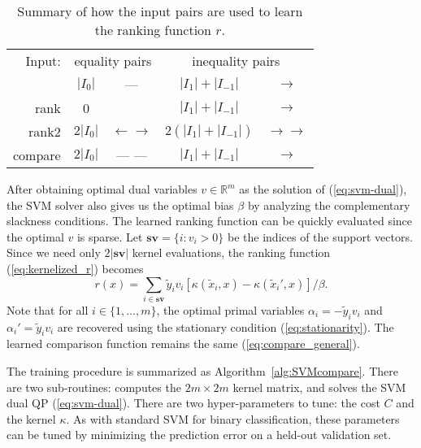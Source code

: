 \documentclass{article}
\newcommand{\RR}{\mathbb R}
\begin{document}
\begin{table}[b!]
  \centering
  \begin{tabular}{r|cc|cc|}
Input:&    \multicolumn{2}{c|}{equality pairs}
&    \multicolumn{2}{c|}{inequality pairs}\\
    & $|I_0|$ %
    & --- 
    & $|I_1|+|I_{-1}|$ %
    & $\rightarrow$
    \\
    \hline
    rank 
    & 0 
    & 
    & $|I_1|+|I_{-1}|$ 
    & $\rightarrow$ 
    \\
    \hline
    rank2 
    & $2|I_0|$ 
    & $\leftarrow \rightarrow$
    & $2(|I_1|+|I_{-1}|)$ 
    & $\rightarrow \rightarrow$
    \\
    \hline
    compare 
    & $2|I_0|$ 
    & --- --- 
    & $|I_1|+|I_{-1}|$ 
    & $\rightarrow$\\
    \hline
  \end{tabular}
  \caption{\label{tab:models}
    Summary of how the input pairs are used to learn the ranking 
    function $r$.}
\end{table}

After obtaining optimal dual variables $v\in\RR^m$ as the solution of
(\ref{eq:svm-dual}), the SVM solver also gives us the optimal bias
$\beta$ by analyzing the complementary slackness conditions.
The learned ranking function can be quickly evaluated since the
optimal $v$ is sparse. Let $\textbf{sv}=\{i: v_i > 0\}$ be the indices
of the support vectors. Since we need only $2|\textbf{sv}|$ kernel
evaluations, the ranking function (\ref{eq:kernelized_r}) becomes
\begin{equation}
  \label{eq:r_sv}
  r(x)= 
  \sum_{i\in \textbf{sv}}
  \tilde y_i v_i\left[ 
    \kappa(\tilde x_i, x)
    - \kappa(\tilde x_i', x)
  \right]/\beta.
\end{equation}
Note that for all $i\in\{1,\dots,m\}$, the optimal primal variables
$\alpha_i=-\tilde y_i v_i$ and $\alpha_i'=\tilde y_i v_i$ are
recovered using the stationary condition (\ref{eq:stationarity}). The
learned comparison function remains the same (\ref{eq:compare_general}).

The training procedure is summarized as
Algorithm~\ref{alg:SVMcompare}. There are two sub-routines:
 computes the $2m\times 2m$ kernel matrix, and
 solves the SVM dual QP (\ref{eq:svm-dual}). There are
two hyper-parameters to tune: the cost $C$ and the kernel $\kappa$. As
with standard SVM for binary classification, these parameters can be
tuned by minimizing the prediction error on a held-out validation set.
\end{document}
